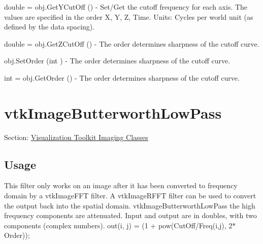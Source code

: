 \begin{DoxyItemize}
\item {\ttfamily double = obj.\-Get\-Y\-Cut\-Off ()} -\/ Set/\-Get the cutoff frequency for each axis. The values are specified in the order X, Y, Z, Time. Units\-: Cycles per world unit (as defined by the data spacing).  
\item {\ttfamily double = obj.\-Get\-Z\-Cut\-Off ()} -\/ The order determines sharpness of the cutoff curve.  
\item {\ttfamily obj.\-Set\-Order (int )} -\/ The order determines sharpness of the cutoff curve.  
\item {\ttfamily int = obj.\-Get\-Order ()} -\/ The order determines sharpness of the cutoff curve.  
\end{DoxyItemize}\hypertarget{vtkimaging_vtkimagebutterworthlowpass}{}\section{vtk\-Image\-Butterworth\-Low\-Pass}\label{vtkimaging_vtkimagebutterworthlowpass}
Section\-: \hyperlink{sec_vtkimaging}{Visualization Toolkit Imaging Classes} \hypertarget{vtkwidgets_vtkxyplotwidget_Usage}{}\subsection{Usage}\label{vtkwidgets_vtkxyplotwidget_Usage}
This filter only works on an image after it has been converted to frequency domain by a vtk\-Image\-F\-F\-T filter. A vtk\-Image\-R\-F\-F\-T filter can be used to convert the output back into the spatial domain. vtk\-Image\-Butterworth\-Low\-Pass the high frequency components are attenuated. Input and output are in doubles, with two components (complex numbers). out(i, j) = (1 + pow(Cut\-Off/\-Freq(i,j), 2$\ast$\-Order));

